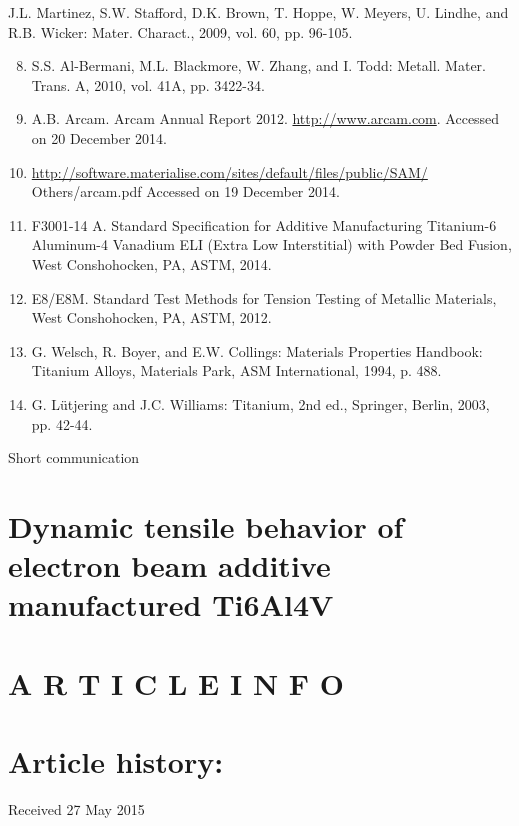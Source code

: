 \documentclass[10pt]{article}
\begin{document}
J.L. Martinez, S.W. Stafford, D.K. Brown, T. Hoppe, W. Meyers, U. Lindhe, and R.B. Wicker: Mater. Charact., 2009, vol. 60, pp. 96-105.

\begin{enumerate}
  \setcounter{enumi}{7}
  \item S.S. Al-Bermani, M.L. Blackmore, W. Zhang, and I. Todd: Metall. Mater. Trans. A, 2010, vol. 41A, pp. 3422-34.

  \item A.B. Arcam. Arcam Annual Report 2012. \href{http://www.arcam.com}{http://www.arcam.com}. Accessed on 20 December 2014.

  \item \href{http://software.materialise.com/sites/default/files/public/SAM/}{http://software.materialise.com/sites/default/files/public/SAM/} Others/arcam.pdf Accessed on 19 December 2014.

  \item F3001-14 A. Standard Specification for Additive Manufacturing Titanium-6 Aluminum-4 Vanadium ELI (Extra Low Interstitial) with Powder Bed Fusion, West Conshohocken, PA, ASTM, 2014.

  \item E8/E8M. Standard Test Methods for Tension Testing of Metallic Materials, West Conshohocken, PA, ASTM, 2012.

  \item G. Welsch, R. Boyer, and E.W. Collings: Materials Properties Handbook: Titanium Alloys, Materials Park, ASM International, 1994, p. 488.

  \item G. Lütjering and J.C. Williams: Titanium, 2nd ed., Springer, Berlin, 2003, pp. 42-44.

\end{enumerate}

Short communication

\section*{Dynamic tensile behavior of electron beam additive manufactured Ti6Al4V }


\section*{A R T I C L E I N F O}
\section*{Article history:}
Received 27 May 2015
\end{document}
